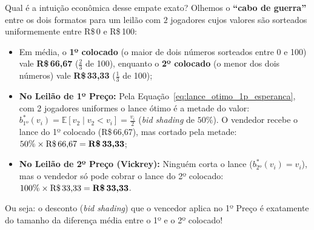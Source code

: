 Qual é a intuição econômica desse empate exato? Olhemos o \textbf{``cabo de guerra''} entre os dois formatos para um leilão com $2$ jogadores cujos valores são sorteados uniformemente entre R\$\,0 e R\$\,100:
\begin{itemize}
    \item Em média, o \textbf{1º colocado} (o maior de dois números sorteados entre 0 e 100) vale \textbf{R\$\,66,67} ($\frac{2}{3}$ de 100), enquanto o \textbf{2º colocado} (o menor dos dois números) vale \textbf{R\$\,33,33} ($\frac{1}{3}$ de 100);
    \item \textbf{No Leilão de 1º Preço:} Pela Equação~\eqref{eq:lance_otimo_1p_esperanca}, com 2 jogadores uniformes o lance ótimo é a metade do valor: $b_{\text{1º}}^*(v_i) = \mathbb{E}[v_2 \mid v_2 < v_i] = \frac{v_i}{2}$ (\textit{bid shading} de $50\%$). O vendedor recebe o lance do 1º colocado (R\$\,66,67), mas cortado pela metade: $50\% \times \text{R\$\,66,67} = \textbf{R\$\,33,33}$;
    \item \textbf{No Leilão de 2º Preço (Vickrey):} Ninguém corta o lance ($b_{\text{2º}}^*(v_i) = v_i$), mas o vendedor só pode cobrar o lance do 2º colocado: $100\% \times \text{R\$\,33,33} = \textbf{R\$\,33,33}$.
\end{itemize}
Ou seja: o desconto (\textit{bid shading}) que o vencedor aplica no 1º Preço é exatamente do tamanho da diferença média entre o 1º e o 2º colocado!


